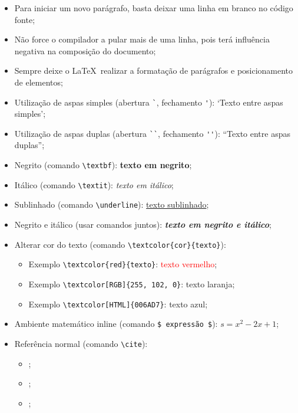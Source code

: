\begin{itemize}
	\item Para iniciar um novo parágrafo, basta deixar uma linha em branco no código fonte;
	\item Não force o compilador a pular mais de uma linha, pois terá influência negativa na composição do documento;
	\item Sempre deixe o \LaTeX\ realizar a formatação de parágrafos e posicionamento de elementos;
	\item Utilização de aspas simples (abertura \verb|`|, fechamento \verb|'|): `Texto entre aspas simples';
	\item Utilização de aspas duplas (abertura \verb|``|, fechamento \verb|''|): ``Texto entre aspas duplas'';
	\item Negrito (comando \verb|\textbf|): \textbf{texto em negrito};
	\item Itálico (comando \verb|\textit|): \textit{texto em itálico};
	\item Sublinhado (comando \verb|\underline|): \underline{texto sublinhado};
	\item Negrito e itálico (usar comandos juntos): \textbf{\textit{texto em negrito e itálico}};
	\item Alterar cor do texto (comando \verb|\textcolor{cor}{texto}|):
	\begin{itemize}
		\item Exemplo \verb|\textcolor{red}{texto}|: \textcolor{red}{texto vermelho};
		\item Exemplo \verb|\textcolor[RGB]{255, 102, 0}|: \textcolor[RGB]{255, 102, 0}{texto laranja};
		\item Exemplo \verb|\textcolor[HTML]{006AD7}|: \textcolor[HTML]{006AD7}{texto azul};
	\end{itemize}
	\item Ambiente matemático inline (comando \verb|$ expressão $|): $s = x^2-2x +1$;
	\item Referência normal (comando \verb|\cite|):
	\begin{itemize}
		\item \cite{Agaisse1995};
		\item \cite{Abedi2014};
		\item \cite{Baum2016};
        

\end{itemize}
\end{itemize}
